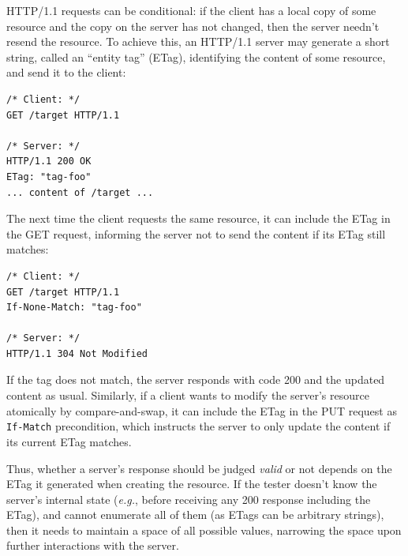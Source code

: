 \documentclass{article}
\newcommand{\http}{HTTP/1.1\xspace}
\newcommand{\inlinec}[1]{\lstinline[style=customc]{#1}}
\theoremstyle{definition}
\begin{document}
\http requests can be conditional: if the client has a local copy of some
resource and the copy on the server has not changed, then the server needn't
resend the resource.  To achieve this, an \http server may generate a short
string, called an ``entity tag'' (ETag), identifying the content of some
resource, and send it to the client:
\begin{lstlisting}[style=customc]
/* Client: */
GET /target HTTP/1.1

/* Server: */
HTTP/1.1 200 OK
ETag: "tag-foo"
... content of /target ...
\end{lstlisting}
The next time the client requests the same resource, it can include the ETag in
the GET request, informing the server not to send the content if its ETag still
matches:

\begin{lstlisting}[style=customc]
/* Client: */
GET /target HTTP/1.1
If-None-Match: "tag-foo"

/* Server: */
HTTP/1.1 304 Not Modified
\end{lstlisting}

If the tag does not match, the server responds with code 200 and the updated
content as usual.  Similarly, if a client wants to modify the server's resource
atomically by compare-and-swap, it can include the ETag in the PUT request as
\inlinec{If-Match} precondition, which instructs the server to only update the
content if its current ETag matches.

Thus, whether a server's response should be judged {\em valid} or not
depends on the ETag it generated
when creating the resource.  If the tester doesn't know the server's internal
state ({\it e.g.}, before receiving any 200 response including the ETag), and
cannot enumerate all of them (as ETags can be arbitrary strings), then it needs
to maintain a space of all possible values, narrowing the space upon further
interactions with the server.
\end{document}
